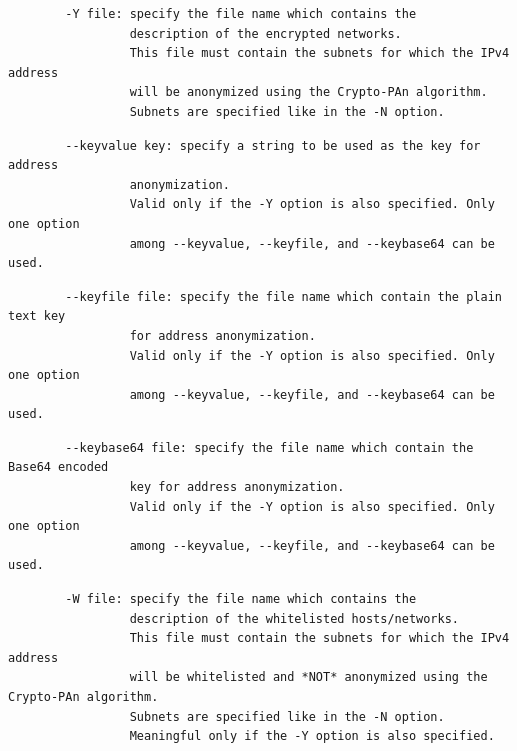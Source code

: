 \documentclass[11pt]{article}
\begin{document}
\begin{small}\begin{verbatim}
        -Y file: specify the file name which contains the
                 description of the encrypted networks.  
                 This file must contain the subnets for which the IPv4 address
                 will be anonymized using the Crypto-PAn algorithm.            
                 Subnets are specified like in the -N option.
\end{verbatim}\end{small} \noindent
\begin{small}\begin{verbatim}
        --keyvalue key: specify a string to be used as the key for address
                 anonymization.                                           
                 Valid only if the -Y option is also specified. Only one option
                 among --keyvalue, --keyfile, and --keybase64 can be used.
\end{verbatim}\end{small} \noindent
\begin{small}\begin{verbatim}
        --keyfile file: specify the file name which contain the plain text key
                 for address anonymization.                                   
                 Valid only if the -Y option is also specified. Only one option
                 among --keyvalue, --keyfile, and --keybase64 can be used.
\end{verbatim}\end{small} \noindent
\begin{small}\begin{verbatim}
        --keybase64 file: specify the file name which contain the Base64 encoded
                 key for address anonymization.                                 
                 Valid only if the -Y option is also specified. Only one option 
                 among --keyvalue, --keyfile, and --keybase64 can be used.
\end{verbatim}\end{small} \noindent
\begin{small}\begin{verbatim}
        -W file: specify the file name which contains the
                 description of the whitelisted hosts/networks.
                 This file must contain the subnets for which the IPv4 address
                 will be whitelisted and *NOT* anonymized using the Crypto-PAn algorithm.
                 Subnets are specified like in the -N option.                            
                 Meaningful only if the -Y option is also specified.
\end{verbatim}\end{small} \noindent
\end{document}
